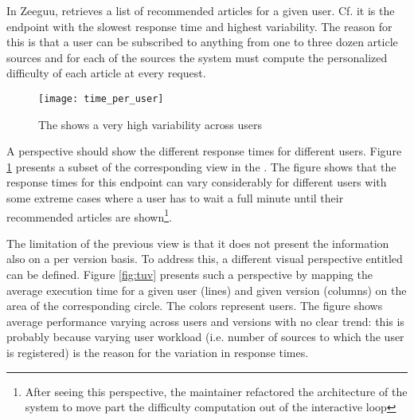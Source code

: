 \documentclass{sig-alternate-05-2015}
\begin{document}

In Zeeguu, \epFeedItems retrieves a list of recommended articles for a given user. Cf.  it is the endpoint with the slowest response time and highest variability. The reason for this is that a user can be subscribed to anything from one to three dozen article sources and for each of the sources the system must compute the personalized difficulty of each article at every request. 



\begin{figure}[!ht]
	\centering
	\texttt{[image: time\_per\_user]}
	\caption{The \epFeedItems shows a very high variability across users}
	\label{fig:tpu}
\end{figure}

A  perspective should show the different response times for different users. Figure \ref{fig:tpu} presents a subset of the corresponding view in the \tool. The figure shows that the response times for this endpoint can vary considerably for different users with some extreme cases where a user has to wait a full minute until their recommended articles are shown\footnote{After seeing this perspective, the maintainer refactored the architecture of the system to move part the difficulty computation out of the interactive loop}.



The limitation of the previous view is that it does not present the information also on a per version basis. To address this, a different visual perspective entitled  can be defined. Figure \ref{fig:tuv} presents such a perspective by mapping the average execution time for a given user (lines) and given version (columns) on the area of the corresponding circle. The colors represent users. The figure shows average performance varying  across users and versions with no clear trend: this is probably because varying user workload (i.e. number of sources to which the user is registered) is the reason for the variation in response times.
\end{document}
